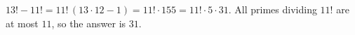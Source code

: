 $13!-11!=11!\,(13\cdot12-1)=11!\cdot155=11!\cdot5\cdot31$. All primes dividing $11!$ are at most $11$, so the answer is $\boxed{31}$.
